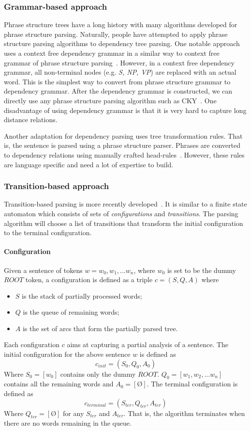 \documentclass[12pt,twoside,final,hidelinks]{ltthesis}
\theoremstyle{definition}
\begin{document}
\subsubsection{Grammar-based approach}
Phrase structure trees have a long history with many algorithms developed for phrase structure parsing. Naturally, people have attempted to apply phrase structure parsing algorithms to dependency tree parsing. One notable approach uses a context free dependency grammar in a similar way to context free grammar of phrase structure parsing~\cite{Nivre_twomodels,eisner-blatz-2007,MarkP07-1022}.
However, in a context free dependency grammar, all non-terminal nodes (e.g. \textit{S, NP, VP}) are replaced with an actual word. This is the simplest way to convert from phrase structure grammar to dependency grammar. After the dependency grammar is constructed, we can directly use any phrase structure parsing algorithm such as CKY~\cite{Younger1967189}. One disadvantage of using dependency grammar is that it is very hard to capture long distance relations.  

Another adaptation for dependency parsing uses tree transformation rules. That is, the sentence is parsed using a phrase structure parser. Phrases are converted to dependency relations using manually crafted head-rules~\cite{Marneffe06generatingtyped,Yamada03statisticaldependency}. However, these rules are language specific and need a lot of expertise to build. 

\subsubsection{Transition-based approach}
Transition-based parsing is more recently developed~\cite{Nivre:2008:ADI}. It is similar to a finite state automaton which consists of sets of \textit{configurations} and \textit{transitions}. The parsing algorithm will choose a list of transitions that transform the initial configuration to the terminal configuration. 
\paragraph{Configuration}
Given a sentence of tokens $w = w_0,w_1, ... w_n$, where $w_0$ is set to be the dummy $ROOT$ token, a configuration is defined as a triple $c=(S,Q,A) $ where 
\begin{itemize}
\item $S$ is the stack of partially processed words; 
\item $Q$ is the queue of remaining words; 
\item $A$ is the set of arcs that form the partially parsed tree. 
\end{itemize}
Each configuration $c$ aims at capturing a partial analysis of a sentence. The initial configuration for the above sentence $w$ is defined as 
$$c_{init}  = (S_0,Q_0,A_0)$$ 
Where $S_0 = [w_0]$ contains only the dummy $ROOT$. $Q_0 = [w_1,w_2,...w_n]$ contains all the remaining words and $A_0 = [\texttt{\O}]$. The terminal configuration is defined as 
$$c_{terminal} = (S_{ter}, Q_{ter}, A_{ter}) $$ 
Where $Q_{ter} = [\texttt{\O}]$ for any $S_{ter}$ and $A_{ter}$. That is, the algorithm terminates when there are no words remaining in the queue. 
\end{document}
